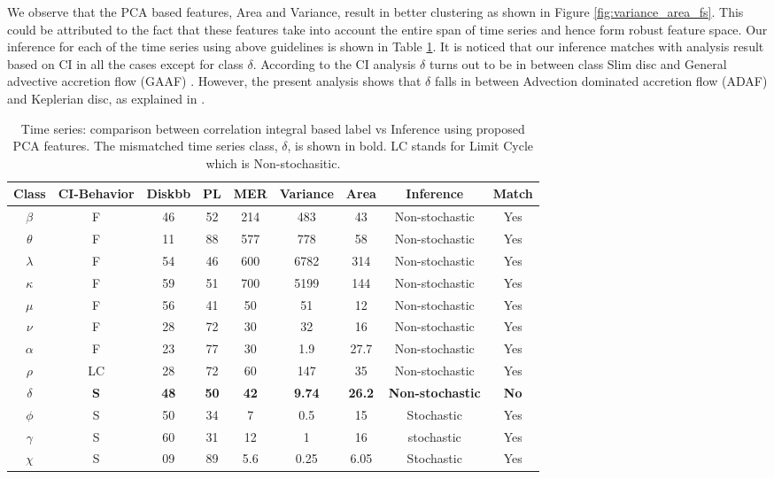 \documentclass[10pt,conference]{IEEEtran}
\begin{document}
We observe  that the PCA based features, Area and Variance,  result in better clustering as shown in Figure \ref{fig:variance_area_fs}. This could be attributed to the fact that   these features take into account the entire span of time series and hence form robust feature space. Our inference for each of the time series using above guidelines is shown in Table \ref{tab:results}. It is noticed that our inference matches with analysis result based on CI in all the cases except for class $\delta$. According to the CI analysis $\delta$ turns out to be in between class Slim disc and General advective accretion flow (GAAF) \cite{Adegoke2018}. However, the present analysis shows that $\delta$ falls in between Advection dominated accretion flow (ADAF) and Keplerian disc, as explained in \cite{Adegoke2018}.

\begin{table}[t]
\caption{Time series: comparison between correlation integral based label vs Inference using proposed PCA features. The mismatched time series class, $\delta$, is shown in bold. LC stands for Limit Cycle \cite{Adegoke2018} which is Non-stochasitic.}
\begin{center}
\begin{tabular}{|c|c|c|c|c|c|c|c|c|}
\hline
Class & CI-Behavior & Diskbb & PL & MER & Variance & Area & Inference & Match\\
\hline
$\beta$ & F & 46 & 52 & 214 & 483 & 43 & Non-stochastic & Yes \\
\hline
$\theta$ & F & 11 &  88 & 577 & 778 & 58&Non-stochastic & Yes \\
\hline
$\lambda$ & F & 54 & 46 & 600 & 6782 & 314 & Non-stochastic & Yes \\
\hline
$\kappa$ & F & 59 & 51 & 700 & 5199 & 144 & Non-stochastic & Yes \\
\hline
$\mu$ & F & 56 & 41 & 50 & 51 & 12 & Non-stochastic & Yes \\
\hline
$\nu$ & F & 28 & 72 & 30 & 32 & 16 & Non-stochastic & Yes \\
\hline
$\alpha$ & F & 23 & 77 & 30 & 1.9 & 27.7 & Non-stochastic & Yes \\
\hline
$\rho$ & LC & 28 & 72 & 60 & 147 & 35 & Non-stochastic & Yes \\
\hline
\textbf{$\delta$} & \textbf{S} & \textbf{48} & \textbf{50} & \textbf{42} & \textbf{9.74} & \textbf{26.2} & \textbf{Non-stochastic} & \textbf{No} \\
\hline
$\phi$ & S & 50 & 34 & 7 & 0.5 & 15 & Stochastic & Yes \\
\hline
$\gamma$ & S & 60 & 31 & 12 & 1 & 16 & stochastic & Yes \\
\hline
$\chi$ & S & 09 & 89 & 5.6 & 0.25 & 6.05 & Stochastic & Yes \\
\hline
\end{tabular}
\label{tab:results}
\end{center}
\end{table}
\end{document}
